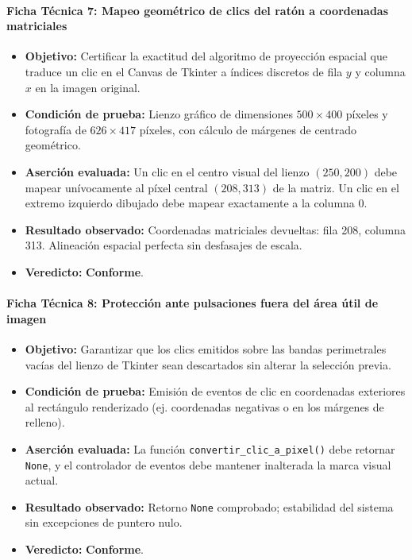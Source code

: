 \documentclass[11pt]{article}
\newcommand{\pruebaok}{\textcolor{verdeExito}{\textbf{Conforme}}}
\begin{document}
\paragraph{Ficha Técnica 7: Mapeo geométrico de clics del ratón a coordenadas matriciales}
\begin{itemize}[itemsep=0.15em]
\item \textbf{Objetivo:} Certificar la exactitud del algoritmo de proyección espacial que traduce un clic en el Canvas de Tkinter a índices discretos de fila $y$ y columna $x$ en la imagen original.
\item \textbf{Condición de prueba:} Lienzo gráfico de dimensiones $500 \times 400$ píxeles y fotografía de $626 \times 417$ píxeles, con cálculo de márgenes de centrado geométrico.
\item \textbf{Aserción evaluada:} Un clic en el centro visual del lienzo $(250, 200)$ debe mapear unívocamente al píxel central $(208, 313)$ de la matriz. Un clic en el extremo izquierdo dibujado debe mapear exactamente a la columna $0$.
\item \textbf{Resultado observado:} Coordenadas matriciales devueltas: fila 208, columna 313. Alineación espacial perfecta sin desfasajes de escala.
\item \textbf{Veredicto:} \pruebaok.
\end{itemize}

\paragraph{Ficha Técnica 8: Protección ante pulsaciones fuera del área útil de imagen}
\begin{itemize}[itemsep=0.15em]
\item \textbf{Objetivo:} Garantizar que los clics emitidos sobre las bandas perimetrales vacías del lienzo de Tkinter sean descartados sin alterar la selección previa.
\item \textbf{Condición de prueba:} Emisión de eventos de clic en coordenadas exteriores al rectángulo renderizado (ej. coordenadas negativas o en los márgenes de relleno).
\item \textbf{Aserción evaluada:} La función \texttt{convertir\_clic\_a\_pixel()} debe retornar \texttt{None}, y el controlador de eventos debe mantener inalterada la marca visual actual.
\item \textbf{Resultado observado:} Retorno \texttt{None} comprobado; estabilidad del sistema sin excepciones de puntero nulo.
\item \textbf{Veredicto:} \pruebaok.
\end{itemize}
\end{document}
